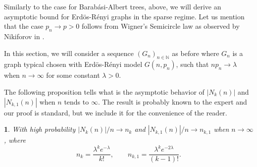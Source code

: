 \documentclass[a4paper]{article}
\newcommand{\N}{\mathbb{N}}
\newcommand{\abs}[1]{\left\lvert#1\right\rvert}
\theoremstyle{plain}
\newtheorem{proposition}{\protect\propname}
\renewcommand{\propname}{Proposition}
\renewcommand{\propname}{Proposici\'on}
\begin{document}
Similarly to the case for Barab\'asi-Albert trees, above, we will derive an asymptotic bound for Erd\"os-R\'enyi graphs in the sparse regime. Let us mention that the case $p_n\to p>0$ follows from Wigner's Semicircle law as observed by Nikiforov in \cite{Nikiforov}.

In this section, we will consider a sequence $(G_n)_{n \in \N}$ as before where $G_n$ is a graph typical chosen with Erd\"os-R\'enyi model \(G(n,p_n)\), such that \(np_n \to \lambda\) when \(n \to \infty\) for some constant \(\lambda > 0\).

The following proposition tells what is the asymptotic behavior of \(\abs{N_k(n)}\) and  \(\abs{N_{k,1}(n)}\) when \(n\) tends to \(\infty\). The result is probably known to the expert and our proof is standard, but we include it for the convenience of the reader.
\begin{proposition}\label{ER-deg}
    With high probability \(\abs{N_k(n)}/n \to n_k\) and \(\abs{N_{k,1}(n)}/n \to n_{k,1}\) when \(n \to \infty\), where
    \[
    n_k = \frac{\lambda^ke^{-\lambda}}{k!}, \qquad n_{k,1} = \frac{\lambda^ke^{-2\lambda}}{(k-1)!}.
    \]
\end{proposition}
\end{document}
